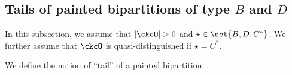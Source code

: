 \documentclass[12pt,a4paper]{amsart}
\def\abs#1{\left|{#1}\right|}
\numberwithin{equation}{section}
\newtheorem{lem}[thm]{Lemma}
\theoremstyle{remark}
\def\CPPs{\mathrm{PP}_{\star}}
\def\PBP{\mathsf{PBP}}
\def\PPm{\wp_{\downarrow}}
\def\uptaum{\uptau_{\downarrow}}
\begin{document}




\subsection{Tails of painted bipartitions of type $B$ and $D$}
\label{sec:tail}
In this subsection, we assume that $\abs{\ckcO}>0$ and
$\star\in\set{B, D, C^*}$. We further assume that $\ckcO$ is quasi-distinguished
if $\star = C^{*}$.

We define the notion of ``tail'' of a painted bipartition.
\end{document}
